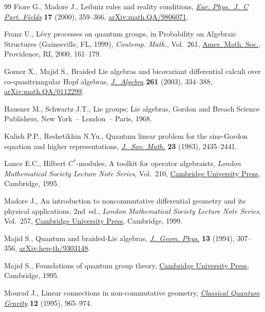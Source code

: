 \begin{thebibliography}{99}
Fiore G., Madore J., Leibniz rules and reality conditions, \href{https://doi.org/10.1007/s100520000470}{\textit{Eur.
 Phys.~J.~C Part. Fields}} \textbf{17} (2000), 359--366,
 \href{https://arxiv.org/abs/math.QA/9806071}{arXiv:math.QA/9806071}.

Franz U., L\'evy processes on quantum groups, in Probability on Algebraic
 Structures ({G}ainesville, {FL}, 1999), \textit{Contemp. Math.}, Vol.~261,
 \href{https://doi.org/10.1090/conm/261/04139}{Amer. Math. Soc.}, Providence, RI, 2000, 161--179.

Gomez X., Majid S., Braided {L}ie algebras and bicovariant differential calculi
 over co-quasitriangular {H}opf algebras, \href{https://doi.org/10.1016/S0021-8693(02)00580-X}{\textit{J.~Algebra}} \textbf{261}
 (2003), 334--388, \href{https://arxiv.org/abs/math.QA/0112299}{arXiv:math.QA/0112299}.

Hausner M., Schwartz J.T., Lie groups; {L}ie algebras, Gordon and Breach
 Science Publishers, New York~-- London~-- Paris, 1968.

Kulish P.P., Reshetikhin N.Yu., Quantum linear problem for the sine-{G}ordon
 equation and higher representations, \href{https://doi.org/10.1007/BF01084171}{\textit{J.~Sov. Math.}} \textbf{23}
 (1983), 2435--2441.

Lance E.C., Hilbert {$C^*$}-modules. A toolkit for operator algebraists,
 \textit{London Mathematical Society Lecture Note Series}, Vol.~210, \href{https://doi.org/10.1017/CBO9780511526206}{Cambridge
 University Press}, Cambridge, 1995.

Madore J., An introduction to noncommutative differential geometry and its
 physical applications, 2nd~ed., \textit{London Mathematical Society Lecture Note
 Series}, Vol.~257, \href{https://doi.org/10.1017/CBO9780511569357}{Cambridge University Press}, Cambridge, 1999.

Majid S., Quantum and braided-{L}ie algebras, \href{https://doi.org/10.1016/0393-0440(94)90014-0}{\textit{J.~Geom. Phys.}}
 \textbf{13} (1994), 307--356, \href{https://arxiv.org/abs/hep-th/9303148}{arXiv:hep-th/9303148}.

Majid S., Foundations of quantum group theory, \href{https://doi.org/10.1017/CBO9780511613104}{Cambridge University Press},
 Cambridge, 1995.

Mourad J., Linear connections in non-commutative geometry, \href{https://doi.org/10.1088/0264-9381/12/4/007}{\textit{Classical
 Quantum Gravity}} \textbf{12} (1995), 965--974.


\end{thebibliography}
